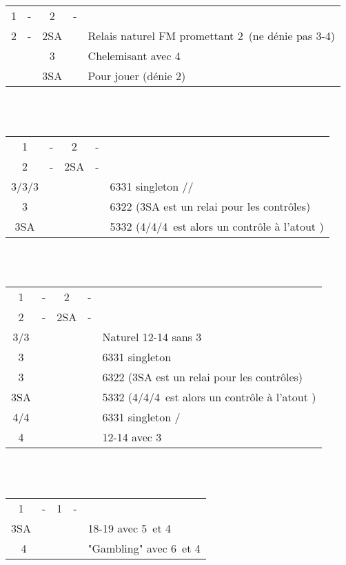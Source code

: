 \documentclass[a4paper, oneside, 11pt]{report}
\begin{document}
		\begin{tabular}{cccc|l}
		1\pique & - & 2\carreau & - &\\
		2\pique & - & 2SA && Relais naturel FM promettant 2\pique\ (ne dénie pas 3-4\pique)\\
		&& 3\pique && Chelemisant avec 4\pique\\
		&& 3SA && Pour jouer (dénie 2\pique)\\
		\end{tabular}\\\\

		\begin{tabular}{cccc|l}
		1\pique & - & 2\trefle & - &\\
		2\pique & - & 2SA & - &\\
		3\trefle/3\carreau/3\coeur &&&& 6331 singleton \trefle/\carreau/\coeur\\
		3\pique &&&& 6322 (3SA est un relai pour les contrôles)\\
		3SA &&&& 5332 (4\trefle/4\carreau/4\coeur\ est alors un contrôle à l'atout \pique)\\
		\end{tabular}\\\\

		\begin{tabular}{cccc|l}
		1\pique & - & 2\coeur & - &\\
		2\pique & - & 2SA & - &\\
		3\trefle/3\carreau &&&& Naturel 12-14 sans 3\coeur\\
		3\coeur &&&& 6331 singleton \coeur\\
		3\pique &&&& 6322 (3SA est un relai pour les contrôles)\\
		3SA &&&& 5332  (4\trefle/4\carreau/4\coeur\ est alors un contrôle à l'atout \pique)\\
		4\trefle/4\carreau &&&& 6331 singleton \trefle/\carreau\\
		4\coeur &&&& 12-14 avec 3\coeur\\
		\end{tabular}\\\\

		\begin{tabular}{cccc|l}
		1\coeur & - & 1\pique & - &\\
		3SA &&&& 18-19 avec 5\coeur\ et 4\pique\\\
		4\pique &&&& "Gambling" avec 6\coeur\ et 4\pique\\
		\end{tabular}\\\\
\end{document}
